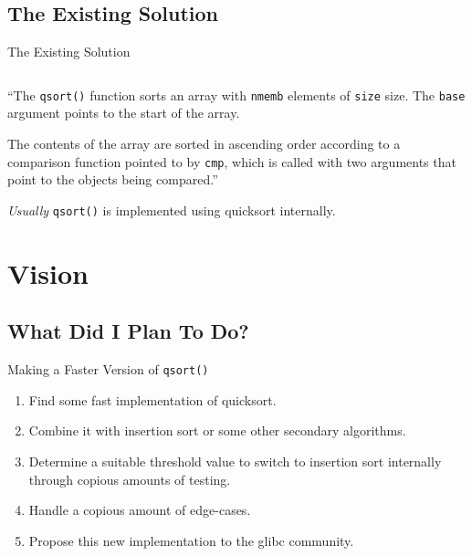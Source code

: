 \documentclass[13pt]{beamer}
\begin{document}
\subsection{The Existing Solution}
\begin{frame}[c]{The Existing Solution}
	\begin{center}
		\begin{minipage}{0.8\textwidth}
			\inputminted{c}{include.c}
		\end{minipage}

		\pause
		\vspace{0.3cm}
		\begin{displayquote}
			``The \texttt{qsort()} function sorts an array with \texttt{nmemb}
			elements of \texttt{size} size. The \texttt{base} argument points to the
			start of the array.

			The contents of the array are sorted in ascending order according to a
			comparison function pointed to by \texttt{cmp}, which is called with two
			arguments that point to the objects being compared.''
		\end{displayquote}

		\pause
		\textit{Usually} \texttt{qsort()} is implemented using quicksort internally.
	\end{center}
\end{frame}

\section{Vision}
\subsection{What Did I Plan To Do?}
\begin{frame}{Making a Faster Version of \texttt{qsort()}}
	\begin{enumerate}
		\item\pause Find some fast implementation of quicksort.
		\item\pause Combine it with insertion sort or some other secondary
		algorithms.
		\item\pause Determine a suitable threshold value to switch to insertion sort
		internally through copious amounts of testing.
		\item\pause Handle a copious amount of edge-cases.
		\item\pause Propose this new implementation to the glibc community.
	\end{enumerate}
\end{frame}
\end{document}
